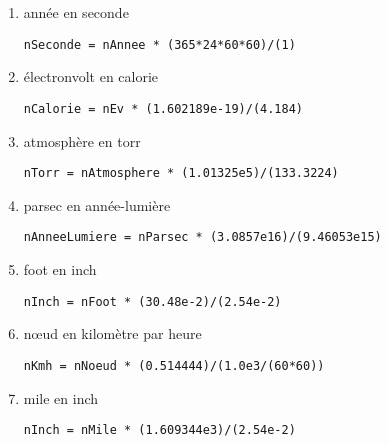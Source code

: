 \documentclass[11pt,a4paper]{article}
\begin{document}
\begin{enumerate}
\item année en seconde\hfill
\begin{minipage}[t]{9.5cm}
\begin{Verbatim}
nSeconde = nAnnee * (365*24*60*60)/(1)
\end{Verbatim}
\end{minipage}


\item électronvolt en calorie\hfill
\begin{minipage}[t]{9.5cm}
\begin{Verbatim}
nCalorie = nEv * (1.602189e-19)/(4.184)
\end{Verbatim}
\end{minipage}


\item atmosphère en torr\hfill
\begin{minipage}[t]{9.5cm}
\begin{Verbatim}
nTorr = nAtmosphere * (1.01325e5)/(133.3224)
\end{Verbatim}
\end{minipage}


\item parsec en année-lumière\hfill
\begin{minipage}[t]{9.5cm}
\begin{Verbatim}
nAnneeLumiere = nParsec * (3.0857e16)/(9.46053e15)
\end{Verbatim}
\end{minipage}


\item foot en inch\hfill
\begin{minipage}[t]{9.5cm}
\begin{Verbatim}
nInch = nFoot * (30.48e-2)/(2.54e-2)
\end{Verbatim}
\end{minipage}

\item n\oe ud en kilomètre par heure\hfill
\begin{minipage}[t]{9.5cm}
\begin{Verbatim}
nKmh = nNoeud * (0.514444)/(1.0e3/(60*60))
\end{Verbatim}
\end{minipage}

\item mile en inch\hfill
\begin{minipage}[t]{9.5cm}
\begin{Verbatim}
nInch = nMile * (1.609344e3)/(2.54e-2)
\end{Verbatim}
\end{minipage}



\end{enumerate}
\end{document}
